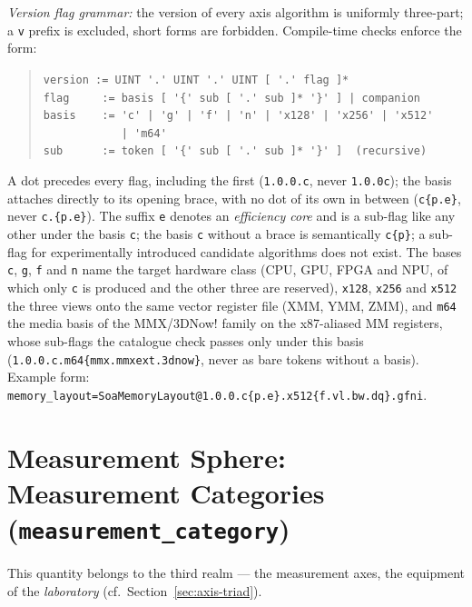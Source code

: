 \emph{Version flag grammar:} the version of every axis algorithm is uniformly three-part; a \texttt{v} prefix is excluded, short forms are forbidden. Compile-time checks enforce the form:

\begin{quote}
\verb+version := UINT '.' UINT '.' UINT [ '.' flag ]*+\\
\verb+flag     := basis [ '{' sub [ '.' sub ]* '}' ] | companion+\\
\verb+basis    := 'c' | 'g' | 'f' | 'n' | 'x128' | 'x256' | 'x512'+\\
\verb+            | 'm64'+\\
\verb+sub      := token [ '{' sub [ '.' sub ]* '}' ]  (recursive)+
\end{quote}

A dot precedes every flag, including the first (\texttt{1.0.0.c}, never \texttt{1.0.0c}); the basis attaches directly to its opening brace, with no dot of its own in between (\texttt{c\{p.e\}}, never \texttt{c.\{p.e\}}). The suffix \texttt{e} denotes an \emph{efficiency core} and is a sub-flag like any other under the basis \texttt{c}; the basis \texttt{c} without a brace is semantically \texttt{c\{p\}}; a sub-flag for experimentally introduced candidate algorithms does not exist. The bases \texttt{c}, \texttt{g}, \texttt{f} and \texttt{n} name the target hardware class (CPU, GPU, FPGA and NPU, of which only \texttt{c} is produced and the other three are reserved), \texttt{x128}, \texttt{x256} and \texttt{x512} the three views onto the same vector register file (XMM, YMM, ZMM), and \texttt{m64} the media basis of the MMX/3DNow! family on the x87-aliased MM registers, whose sub-flags the catalogue check passes only under this basis (\texttt{1.0.0.c.m64\{mmx.mmxext.3dnow\}}, never as bare tokens without a basis). Example form: \texttt{memory\_\allowbreak{}layout=\allowbreak{}SoaMemoryLayout@\allowbreak{}1.0.0.c\{p.e\}.\allowbreak{}x512\{f.vl.bw.dq\}.\allowbreak{}gfni}.

\section[head={Measurement Sphere: Measurement Categories}]{Measurement Sphere: Measurement Categories (\texttt{measurement\_category})}

This quantity belongs to the third realm --- the measurement axes, the equipment of the \emph{laboratory} (cf.\ Section~\ref{sec:axis-triad}).

